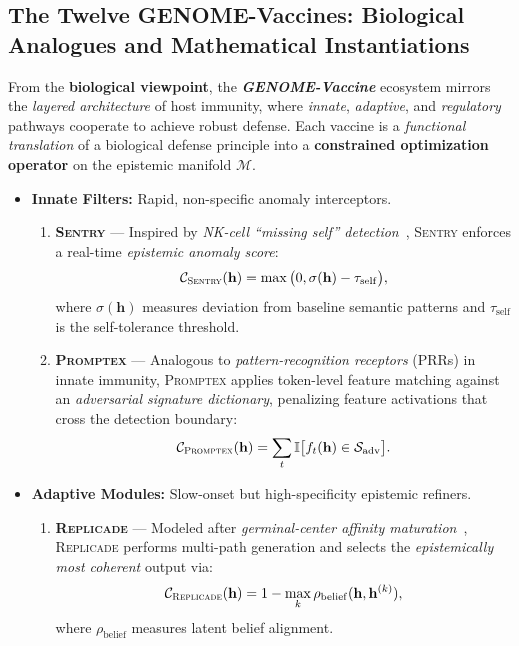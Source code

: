 \subsection{The Twelve GENOME-Vaccines: Biological Analogues and Mathematical Instantiations}

From the \textbf{biological viewpoint}, the \textbf{\emph{GENOME-Vaccine}} ecosystem mirrors the \emph{layered architecture} of host immunity, where \emph{innate}, \emph{adaptive}, and \emph{regulatory} pathways cooperate to achieve robust defense. Each vaccine is a \emph{functional translation} of a biological defense principle into a \textbf{constrained optimization operator} on the epistemic manifold $\mathcal{M}$. 

\begin{itemize}
    \item \textbf{Innate Filters:} Rapid, non-specific anomaly interceptors.
    \begin{enumerate}
        \item \textbf{\textsc{Sentry}} — Inspired by \emph{NK-cell ``missing self'' detection}~\cite{vivier2011innate}, \textsc{Sentry} enforces a real-time \emph{epistemic anomaly score}:
        \[
        \mathcal{C}_{\textsc{Sentry}}(\mathbf{h}) = \max\big(0, \sigma(\mathbf{h}) - \tau_\mathrm{self}\big),
        \]
        where $\sigma(\mathbf{h})$ measures deviation from baseline semantic patterns and $\tau_\mathrm{self}$ is the self-tolerance threshold.

        \item \textbf{\textsc{Promptex}} — Analogous to \emph{pattern-recognition receptors} (PRRs) in innate immunity, \textsc{Promptex} applies token-level feature matching against an \emph{adversarial signature dictionary}, penalizing feature activations that cross the detection boundary:
        \[
        \mathcal{C}_{\textsc{Promptex}}(\mathbf{h}) = \sum_{t} \mathbb{I}\big[f_t(\mathbf{h}) \in \mathcal{S}_\mathrm{adv}\big].
        \]
    \end{enumerate}

    \item \textbf{Adaptive Modules:} Slow-onset but high-specificity epistemic refiners.
    \begin{enumerate}
        \item \textbf{\textsc{Replicade}} — Modeled after \emph{germinal-center affinity maturation}~\cite{kelsoe1996life}, \textsc{Replicade} performs multi-path generation and selects the \emph{epistemically most coherent} output via:
        \[
        \mathcal{C}_{\textsc{Replicade}}(\mathbf{h}) = 1 - \max_{k} \rho_\mathrm{belief}(\mathbf{h}, \mathbf{h}^{(k)}),
        \]
        where $\rho_\mathrm{belief}$ measures latent belief alignment.


\end{enumerate}
\end{itemize}
